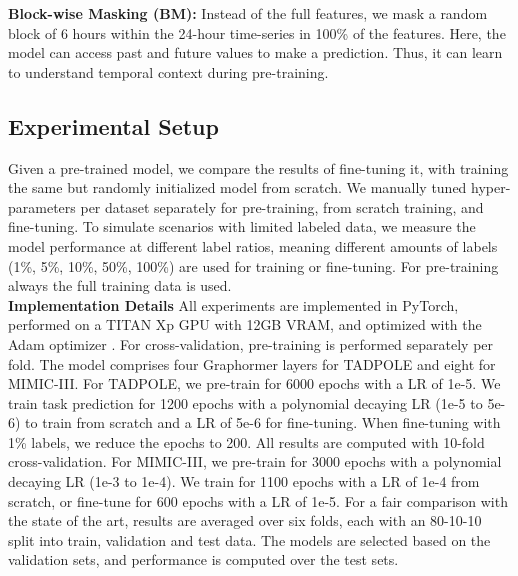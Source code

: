 \documentclass[runningheads]{llncs}
\begin{document}
\textbf{Block-wise Masking (BM):} Instead of the full features, we mask a random block of 6 hours within the 24-hour time-series in 100\% of the features. Here, the model can access past and future values to make a prediction. Thus, it can learn to understand temporal context during pre-training.

\subsection{Experimental Setup}
Given a pre-trained model, we compare the results of fine-tuning it, with training the same but randomly initialized model from scratch.
We manually tuned hyper-parameters per dataset separately for pre-training, from scratch training, and fine-tuning. To simulate scenarios with limited labeled data, we measure the model performance at different label ratios, meaning different amounts of labels (1\%, 5\%, 10\%, 50\%, 100\%) are used for training or fine-tuning. For pre-training always the full training data is used.\\
\textbf{Implementation Details}
All experiments are implemented in PyTorch, performed on a TITAN Xp GPU with 12GB VRAM, and optimized with the Adam optimizer \cite{kingma2014adam}. For cross-validation, pre-training is performed separately per fold. The model comprises four Graphormer layers for TADPOLE and eight for MIMIC-III. For TADPOLE, we pre-train for 6000 epochs with a LR of 1e-5. We train task prediction for 1200 epochs with a polynomial decaying LR (1e-5 to 5e-6) to train from scratch and a LR of 5e-6 for fine-tuning. When fine-tuning with 1\% labels, we reduce the epochs to 200. All results are computed with 10-fold cross-validation. For MIMIC-III, we pre-train for 3000 epochs with a polynomial decaying LR (1e-3 to 1e-4). We train for 1100 epochs with a LR of 1e-4 from scratch, or fine-tune for 600 epochs with a LR of 1e-5. For a fair comparison with the state of the art, results are averaged over six folds, each with an 80-10-10 split into train, validation and test data. The models are selected based on the validation sets, and performance is computed over the test sets.
\end{document}
